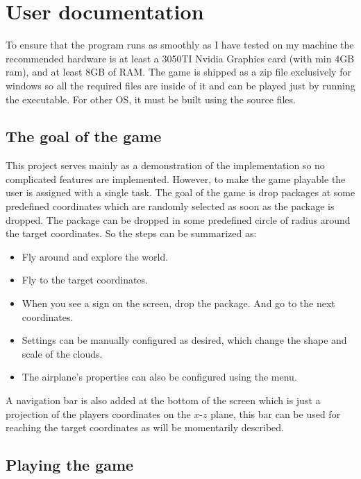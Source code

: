 \chapter{User documentation}
\label{ch:user}

To ensure that the program runs as smoothly as I have tested on my machine the recommended hardware is at least a 3050TI Nvidia Graphics card (with min 4GB ram), and at least 8GB of RAM. The game is shipped as a zip file exclusively for windows so all the required files are inside of it and can be played just by running the executable. For other OS, it must be built using the source files.


\section{The goal of the game}

This project serves mainly as a demonstration of the implementation so no complicated features are implemented. However, to make the game playable the user is assigned with a single task. The goal of the game is drop packages at some predefined coordinates which are randomly selected as soon as the package is dropped. The package can be dropped in some predefined circle of radius around the target coordinates. So the steps can be summarized as: 

\begin{itemize}
	\item Fly around and explore the world.
	\item Fly to the target coordinates.
	\item When you see a sign on the screen, drop the package. And go to the next coordinates.
	\item Settings can be manually configured as desired, which change the shape and scale of the clouds.
	\item The airplane's properties can also be configured using the menu.
\end{itemize}

A navigation bar is also added at the bottom of the screen which is just a projection of the players coordinates on the $x$-$z$ plane, this bar can be used for reaching the target coordinates as will be momentarily described.

\section{Playing the game}

